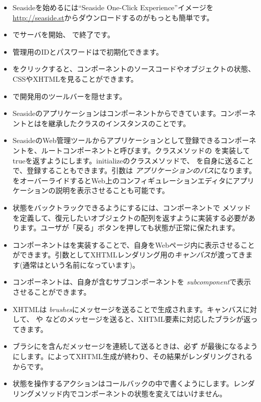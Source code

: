\documentclass[a4paper,10pt,twoside]{book}
\begin{document}
\begin{itemize}
  \item Seasideを始めるには``Seaside One-Click Experience''イメージを \url{http://seaside.st}からダウンロードするのがもっとも簡単です。
  \item {} でサーバを開始、 で終了です。
  \item 管理用のIDとパスワードはで初期化できます。
  \item {} をクリックすると、コンポーネントのソースコードやオブジェクトの状態、CSSやXHTMLを見ることができます。
  \item {} で開発用のツールバーを隠せます。
  \item Seasideのアプリケーションはコンポーネントからできています。コンポーネントとはを継承したクラスのインスタンスのことです。
  \item SeasideのWeb管理ツールからアプリケーションとして登録できるコンポーネントを、ルートコンポーネントと呼びます。クラスメソッドの  を実装してtrueを返すようにします。initializeのクラスメソッドで、  を自身に送ることで、登録することもできます。引数は \emph{アプリケーションのパス}になります。  をオーバーライドするとWeb上のコンフィギュレーションエディタにアプリケーションの説明を表示させることも可能です。
  \item 状態をバックトラックできるようにするには、コンポーネントで  メソッドを定義して、復元したいオブジェクトの配列を返すように実装する必要があります。ユーザが「戻る」ボタンを押しても状態が正常に保たれます。
  \item コンポーネントはを実装することで、自身をWebページ内に表示させることができます。引数としてXHTMLレンダリング用の\emph{キャンバス}が渡ってきます(通常はという名前になっています)。
  \item コンポーネントは、自身が含むサブコンポーネントを  \emph{subcomponent}で表示させることができます。
  \item XHTMLは \emph{brushes}にメッセージを送ることで生成されます。キャンバスに対して、  や などのメッセージを送ると、XHTML要素に対応したブラシが返ってきます。
  \item ブラシにを含んだメッセージを連続して送るときは、必ず が最後になるようにします。によってXHTML生成が終わり、その結果がレンダリングされるからです。
  \item 状態を操作するアクションはコールバックの中で書くようにします。レンダリングメソッド内でコンポーネントの状態を変えてはいけません。

\end{itemize}
\end{document}
